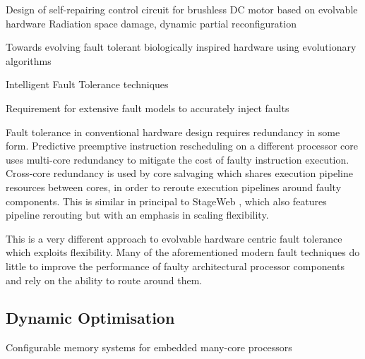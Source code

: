 \todo Design of self-repairing control circuit for brushless DC motor based on evolvable hardware\cite{8046381}
Radiation space damage, dynamic partial reconfiguration

\todo Towards evolving fault tolerant biologically inspired hardware using evolutionary algorithms

\todo Intelligent Fault Tolerance techniques

\todo Requirement for extensive fault models to accurately inject faults

Fault tolerance in conventional hardware design requires redundancy in some
form. Predictive preemptive instruction rescheduling on a different processor
core \cite{Soman} uses multi-core redundancy to mitigate the cost of faulty instruction
execution. Cross-core redundancy is used by core salvaging \cite{Powell} which shares execution
pipeline resources between cores, in order to reroute execution pipelines
around faulty components. This is similar in principal to StageWeb \cite{StageWeb}, which also
features pipeline rerouting but with an emphasis in scaling flexibility.

This is a very different approach to evolvable hardware centric fault
tolerance which exploits flexibility. Many of the aforementioned modern
fault techniques do little to improve the performance of faulty architectural
processor components and rely on the ability to route around them.

\subsection{Dynamic Optimisation}
\todo Configurable memory systems for embedded many-core processors\cite{DBLP:journals/corr/BatesCM16}
